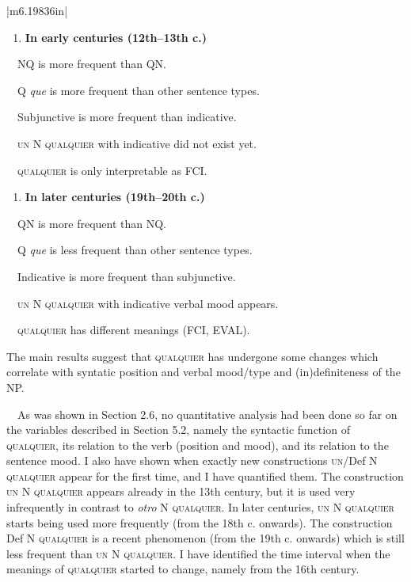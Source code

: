 \documentclass[10pt]{article}
\newenvironment{styleStandard}{\renewcommand\baselinestretch{1.25}\setlength\leftskip{0cm}\setlength\rightskip{0cm}\setlength\parindent{0cm}\setlength\parfillskip{0pt plus 1fil}\setlength\parskip{0in plus 1pt}\writerlistparindent\writerlistleftskip\leavevmode\normalfont\normalsize\fontsize{12pt}{14.4pt}\selectfont\writerlistlabel\ignorespaces}{\unskip\vspace{0in plus 1pt}\par}
\newcounter{saveenum}
\newcommand\writerlistleftskip{}
\newcommand\writerlistparindent{}
\newcommand\writerlistlabel{}
\newcommand\liststyleWWNumx{%
\renewcommand\theenumi{\arabic{enumi}}
\renewcommand\theenumii{\alph{enumii}}
\renewcommand\theenumiii{\arabic{enumiii}}
\renewcommand\theenumiv{\arabic{enumiv}}
\renewcommand\labelenumi{(\theenumi)}
\renewcommand\labelenumii{\theenumii.}
\renewcommand\labelenumiii{\theenumiii.}
\renewcommand\labelenumiv{\theenumiv.}
}
\begin{document}
\begin{flushleft}
\tablefirsthead{}
\tablehead{}
\tabletail{}
\tablelasttail{}
\begin{supertabular}{|m{6.19836in}|}
\hline
\liststyleWWNumx
\begin{enumerate}
\item {\bfseries \textmd{In early centuries (12th–13th c.) }}
\end{enumerate}
\ \ NQ is more frequent than QN.

\ \ Q \textit{que} is more frequent than other sentence types.

\ \ Subjunctive is more frequent than indicative.

\ \ \textsc{un} N \textsc{qualquier} with indicative did not exist yet.

\ \ \textsc{qualquier} is only interpretable as FCI.

\liststyleWWNumx
\setcounter{saveenum}{\value{enumi}}
\begin{enumerate}
\setcounter{enumi}{\value{saveenum}}
\item {\bfseries \textmd{In later centuries (19th–20th c.)}}
\end{enumerate}
\ \ QN is more frequent than NQ.

\ \ Q\textit{ que} is less frequent than other sentence types.

\ \ Indicative is more frequent than subjunctive.

\ \ \textsc{un} N \textsc{qualquier} with indicative verbal mood appears.

\ \ \textsc{qualquier} has different meanings (FCI, EVAL).\\\hline
\end{supertabular}
\end{flushleft}
\begin{styleStandard}
The main results suggest that \textsc{qualquier} has undergone some changes which correlate with syntatic position and verbal mood/type and (in)definiteness of the NP.
\end{styleStandard}

\begin{styleStandard}
\ \ As was shown in Section 2.6, no quantitative analysis had been done so far on the variables described in Section 5.2, namely the syntactic function of \textsc{qualquier}, its relation to the verb (position and mood), and its relation to the sentence mood. I also have shown when exactly new constructions \textsc{un}/Def N \textsc{qualquier} appear for the first time, and I have quantified them. The construction \textsc{un} N \textsc{qualquier} appears already in the 13th century, but it is used very infrequently in contrast to \textit{otro} N \textsc{qualquier}. In later centuries, \textsc{un} N \textsc{qualquier} starts being used more frequently (from the 18th c. onwards). The construction Def N \textsc{qualquier }is a recent phenomenon (from the 19th c. onwards) which is still less frequent than \textsc{un} N \textsc{qualquier. }I have identified the time interval when the meanings of \textsc{qualquier} started to change, namely from the 16th century.
\end{styleStandard}
\end{document}
